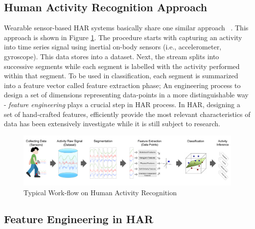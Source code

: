 \documentclass[journal,article,submit,moreauthors,pdftex]{Definitions/mdpi}
\begin{document}
\subsection{Human Activity Recognition Approach}
Wearable sensor-based HAR systems basically share one similar approach ~\cite{s140610146}. This approach is shown in Figure \ref{fig:main_approach}. The procedure starts with capturing an activity into time series signal using inertial on-body sensors (i.e., accelerometer, gyroscope). This data stores into a dataset. Next, the stream splits into successive segments while each segment is labelled with the activity performed within that segment. To be used in classification, each segment is summarized into a feature vector called feature extraction phase; An engineering process to design a set of dimensions representing data-points in a more distinguishable way - \textit{feature engineering} plays a crucial step in HAR process. In HAR, designing a set of hand-crafted features, efficiently provide the most relevant characteristics of data has been extensively investigate while it is still subject to research.

\begin{figure}[H]
	\centering
	\includegraphics[width=15.5 cm]{Definitions/images/main_approach.jpg}
	\caption{Typical Work-flow on Human Activity Recognition}
	\label{fig:main_approach}
\end{figure} 

\subsection{Feature Engineering in HAR}
\end{document}
